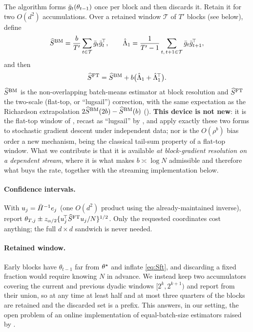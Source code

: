 The algorithm forms $\bar{g}_t(\theta_{t-1})$ once per block and then discards it. Retain it
for two $O(d^2)$ accumulations. Over a retained window $\mathcal{T}$ of $T'$ blocks
(see below), define
\begin{equation}
\widehat{S}^{\mathrm{BM}}=\frac{b}{T'}\sum_{t\in\mathcal{T}}\bar{g}_t\bar{g}_t^{\!\top},
\qquad
\hat\Lambda_1=\frac{1}{T'-1}\sum_{t,\,t+1\in\mathcal{T}}\bar{g}_t\bar{g}_{t+1}^{\!\top},
\label{eq:Sft}
\end{equation}
and then
\begin{equation}
\widehat{S}^{\mathrm{FT}}=\widehat{S}^{\mathrm{BM}}+b\big(\hat\Lambda_1+\hat\Lambda_1^{\!\top}\big).
\label{eq:Sft2}
\end{equation}
$\widehat{S}^{\mathrm{BM}}$ is the non-overlapping batch-means estimator at block resolution and $\widehat{S}^{\mathrm{FT}}$ the two-scale
(flat-top, or ``lugsail'') correction, with the same expectation as the Richardson extrapolation
$2\widehat{S}^{\mathrm{BM}}(2b)-\widehat{S}^{\mathrm{BM}}(b)$ (). \textbf{This device is not new}: it is the flat-top window of
\citet{politis1995bias}, recast as ``lugsail'' by \citet{vats2022lugsail}, and
\citet[Eqs.~(15) and (17)]{singh2025utility} apply exactly these two forms to stochastic gradient descent
under independent data; nor is the $O(\rho^b)$ bias order a new mechanism, being the classical tail-sum
property of a flat-top window. What we contribute is that it is available \emph{at block-gradient
resolution on a dependent stream}, where it is what makes $b\asymp\log N$ admissible and therefore what
buys the rate, together with the streaming implementation below.

\paragraph{Confidence intervals.} With $u_j=\bar{H}^{-1}e_j$ (one $O(d^2)$ product using the
already-maintained inverse), report
$\theta_{T,j}\pm z_{\alpha/2}\{u_j^{\!\top}\widehat{S}^{\mathrm{FT}} u_j/N\}^{1/2}$. Only the requested
coordinates cost anything; the full $d\times d$ sandwich is never needed.

\paragraph{Retained window.} Early blocks have $\theta_{t-1}$ far from $\theta^\star$ and inflate \eqref{eq:Sft},
and discarding a fixed fraction would require knowing $N$ in advance. We instead keep two accumulators
covering the current and previous dyadic windows $[2^{k},2^{k+1})$ and report from their union, so at any
time at least half and at most three quarters of the blocks are retained and the discarded set is a prefix.
This answers, in our setting, the open problem of an online implementation of equal-batch-size estimators
raised by \citet[Remark~4]{singh2025utility}.

